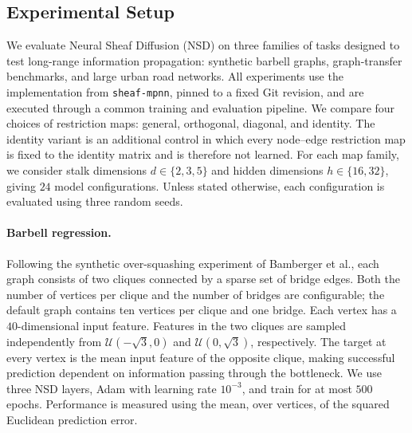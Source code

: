 \subsection{Experimental Setup}
\label{subsec:experimental-setup}

We evaluate Neural Sheaf Diffusion (NSD) on three families of tasks designed
to test long-range information propagation: synthetic barbell graphs,
graph-transfer benchmarks, and large urban road networks. All experiments use
the implementation from \texttt{sheaf-mpnn}, pinned to a fixed Git revision,
and are executed through a common training and evaluation pipeline. We compare
four choices of restriction maps: general, orthogonal, diagonal, and identity.
The identity variant is an additional control in which every node--edge
restriction map is fixed to the identity matrix and is therefore not learned.
For each map family, we consider stalk dimensions
$d \in \{2,3,5\}$ and hidden dimensions
$h \in \{16,32\}$, giving $24$ model configurations. Unless stated otherwise,
each configuration is evaluated using three random seeds.

\paragraph{Barbell regression.}
Following the synthetic over-squashing experiment of
Bamberger et al., each graph consists of two cliques connected by a sparse
set of bridge edges. Both the number of vertices per clique and the number of
bridges are configurable; the default graph contains ten vertices per clique
and one bridge. Each vertex has a $40$-dimensional input feature. Features in
the two cliques are sampled independently from
$\mathcal{U}(-\sqrt{3},0)$ and $\mathcal{U}(0,\sqrt{3})$, respectively. The
target at every vertex is the mean input feature of the opposite clique,
making successful prediction dependent on information passing through the
bottleneck. We use three NSD layers, Adam with learning rate $10^{-3}$, and
train for at most $500$ epochs. Performance is measured using the mean,
over vertices, of the squared Euclidean prediction error.

